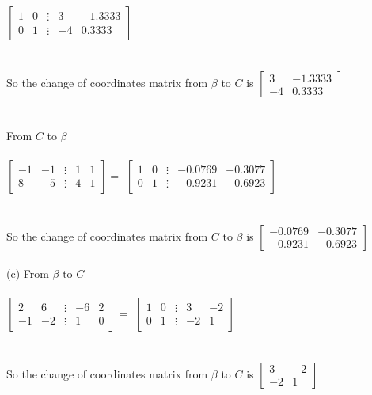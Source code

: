 \documentclass{article}
\begin{document}
$ \begin{bmatrix}1&0&\vdots&3&-1.3333\\0&1&\vdots&-4&0.3333\end{bmatrix}$
\\\\\\
\indent\indent\indent So the change of coordinates matrix from $\beta$ to $C$ is $ \begin{bmatrix}3&-1.3333\\-4&0.3333\end{bmatrix}$
\\\\\\
\indent\indent\indent From $C$ to $\beta$
\\\\
\indent\indent\indent$\begin{bmatrix}-1&-1&\vdots&1&1\\8&-5&\vdots&4&1\end{bmatrix} =$
$ \begin{bmatrix}1&0&\vdots&-0.0769&-0.3077\\0&1&\vdots&-0.9231&-0.6923\end{bmatrix}$
\\\\\\
\indent\indent\indent So the change of coordinates matrix from $C$ to $\beta$ is $ \begin{bmatrix}-0.0769&-0.3077\\-0.9231&-0.6923\end{bmatrix}$
\\\\
\indent(c)\indent
\space From $\beta$ to $C$
\\\\
\indent\indent\indent$\begin{bmatrix}2&6&\vdots&-6&2\\-1&-2&\vdots&1&0\end{bmatrix} =$
$ \begin{bmatrix}1&0&\vdots&3&-2\\0&1&\vdots&-2&1\end{bmatrix}$
\\\\\\
\indent\indent\indent So the change of coordinates matrix from $\beta$ to $C$ is $ \begin{bmatrix}3&-2\\-2&1\end{bmatrix}$
\end{document}
